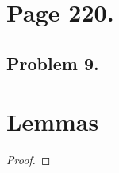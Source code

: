 \documentclass[12pt]{extarticle}
\begin{document}
\section*{Page 220.}
\subsection*{Problem 9.}

\section*{Lemmas}

\begin{lemma} \label{complimentlem}

\end{lemma}
\begin{proof}

\end{proof}
\end{document}
